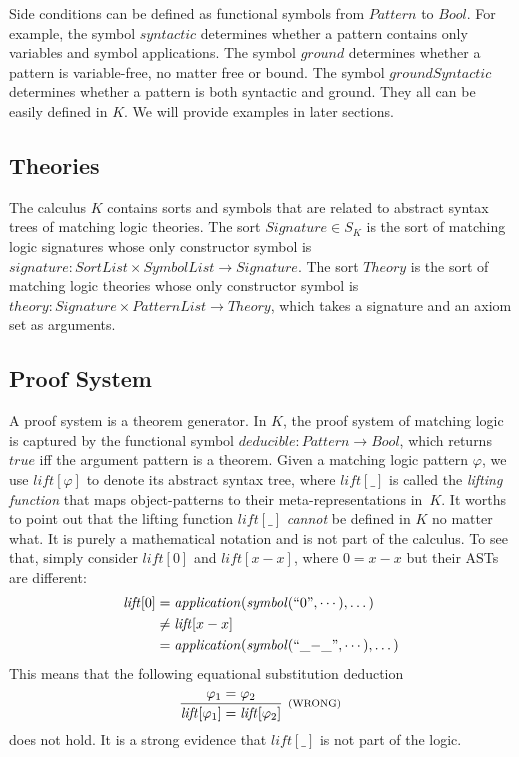 \documentclass[UTF8]{article}
\theoremstyle{plain}
\theoremstyle{definition}
\theoremstyle{remark}
\newcommand{\rl}[1]{\text{\scriptsize{(#1)}}}
\begin{document}
Side conditions can be defined as functional symbols from $\mathit{Pattern}$ to $\mathit{Bool}$. 
For example, the symbol $\mathit{syntactic}$ determines whether a pattern contains only variables and symbol applications. 
The symbol $\mathit{ground}$ determines whether a pattern is variable-free, no matter free or bound. 
The symbol $\mathit{groundSyntactic}$ determines whether a pattern is both syntactic and ground.
They all can be easily defined in $K$.
We will provide examples in later sections. 

\subsection{Theories}

The calculus $K$ contains sorts and symbols that are related to abstract syntax trees of matching logic theories. 
The sort $\mathit{Signature} \in S_K$ is the sort of matching logic signatures whose only constructor symbol is $\mathit{signature} \colon \mathit{SortList} \times \mathit{SymbolList} \to \mathit{Signature}$. 
The sort $\mathit{Theory}$ is the sort of matching logic theories whose only constructor symbol is $\mathit{theory} \colon \mathit{Signature} \times \mathit{PatternList} \to \mathit{Theory}$, which takes a signature and an axiom set as arguments.



\subsection{Proof System}

A proof system is a theorem generator. 
In $K$, the proof system of matching logic is captured by the functional symbol $\mathit{deducible} \colon \mathit{Pattern} \to \mathit{Bool}$, which returns $\mathit{true}$ iff the argument pattern is a theorem. 
Given a matching logic pattern $\varphi$, we use $\mathit{lift[\varphi]}$ to 
denote its 
abstract syntax tree, where $\mathit{lift}[\_]$ is called the \emph{lifting 
function}
that maps object-patterns to their meta-representations in~$K$.
It worths to point out that the lifting function $\mathit{lift}[\_]$  \emph{cannot} be defined in $K$ no matter what.
It is purely a mathematical notation and is not part of the calculus.
To see that, simply consider $\mathit{lift}[0]$ and $\mathit{lift}[x - x]$, 
where $0 = 
x - x$ but their ASTs are different:
\begin{align*}
\mathit{lift}[0]
&= \mathit{application}(\mathit{symbol}(``\text{0}", \cdots),\dots) \\
&\neq \mathit{lift}[x - x] \\
&= \mathit{application}(\mathit{symbol}(``\text{\_$-$\_}",\cdots), \dots)
\end{align*}
This means that the following equational substitution deduction
$$
\infer[\rl{WRONG}]{\mathit{lift}[\varphi_1] = \mathit{lift}[\varphi_2]}
{\varphi_1 = \varphi_2}
$$
does not hold. It is a strong evidence that $\mathit{lift}[\_]$ is not part of 
the logic.
\end{document}
